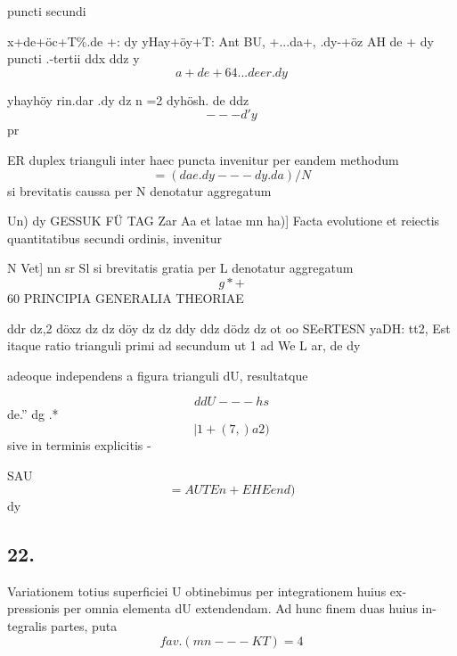 \documentclass[12pt,a4paper]{article}
\begin{document}
puncti secundi

x+de+öc+T\%.de +: dy
yHay+öy+T: Ant BU,
+...da+, .dy-+öz AH de +                        dy
puncti .-tertii
ddx        ddz     y
\[                  a +de +64... deer                  .dy\]

yhayhöy rin.dar .dy
dz   n     =2 dyhösh.
de ddz
\[                                                               --- d'y\]
pr

ER duplex trianguli inter haec puncta invenitur per eandem methodum
\[                               = (dae.dy---dy.da)/N\]
si brevitatis caussa per N denotatur aggregatum

Un)        dy
GESSUK FÜ TAG Zar Aa
et          latae             mn ha)]
Facta evolutione et reiectis quantitatibus secundi ordinis, invenitur

N
Vet]                                   nn
sr Sl
si brevitatis gratia per L denotatur aggregatum
\[                                                                       g*+\]
60                                 PRINCIPIA      GENERALIA         THEORIAE

ddr        dz,2   döxz   dz   dz       döy   dz    dz          ddy                          ddz          dödz    dz
ot                oo                   SEeRTESN yaDH:                                             tt2,
Est itaque ratio trianguli primi ad secundum ut 1 ad
We L
ar,        de           dy

adeoque independens a figura trianguli                  dU,         resultatque

\[                                     ddU---                     hs\]
de.''         dg   .*
\[                                        |          1+(7,)             a2)\]
sive in terminis explicitis -

SAU
\[  = AUT                                 En                     + EHE                                                 end)\]
dy



\subsection*{22.}

Variationem totius superficiei U obtinebimus per integrationem huius ex-
pressionis per omnia elementa dU extendendam.      Ad hunc finem duas huius in-
tegralis partes, puta
\[                       fav.( mn                                       --- KT)             =    4\]
\end{document}
